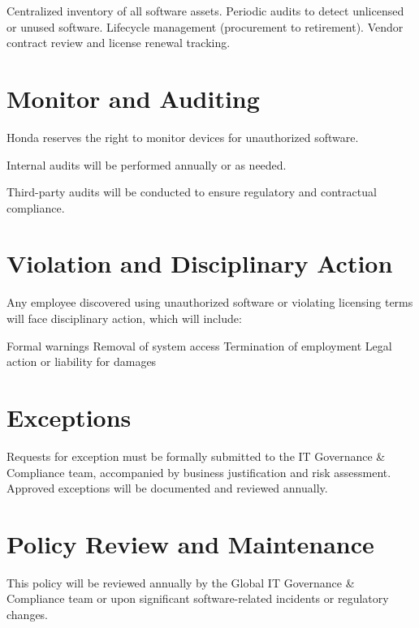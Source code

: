     Centralized inventory of all software assets.
    Periodic audits to detect unlicensed or unused software.
    Lifecycle management (procurement to retirement).
    Vendor contract review and license renewal tracking.
    
\section{Monitor and Auditing}

Honda reserves the right to monitor devices for unauthorized software.

Internal audits will be performed annually or as needed.

Third-party audits will be conducted to ensure regulatory and contractual compliance.

\section{Violation and Disciplinary Action}

Any employee discovered using unauthorized software or violating licensing terms will face disciplinary action, which will include:
    
    Formal warnings
    Removal of system access
    Termination of employment
    Legal action or liability for damages

\section{Exceptions}

Requests for exception must be formally submitted to the IT Governance & Compliance team, accompanied by business justification and risk assessment. Approved exceptions will be documented and reviewed annually.

\section{Policy Review and Maintenance}

This policy will be reviewed annually by the Global IT Governance & Compliance team or upon significant software-related incidents or regulatory changes.
